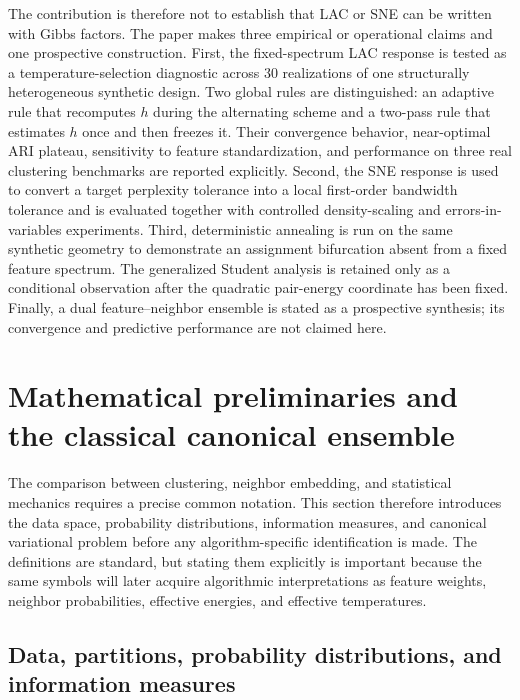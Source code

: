 \documentclass[11pt,a4paper]{article}
\theoremstyle{definition}
\theoremstyle{plain}
\begin{document}
The contribution is therefore not to establish that LAC or SNE can be written with Gibbs factors. The paper makes three empirical or operational claims and one prospective construction. First, the fixed-spectrum LAC response is tested as a temperature-selection diagnostic across 30 realizations of one structurally heterogeneous synthetic design. Two global rules are distinguished: an adaptive rule that recomputes $h$ during the alternating scheme and a two-pass rule that estimates $h$ once and then freezes it. Their convergence behavior, near-optimal ARI plateau, sensitivity to feature standardization, and performance on three real clustering benchmarks are reported explicitly. Second, the SNE response is used to convert a target perplexity tolerance into a local first-order bandwidth tolerance and is evaluated together with controlled density-scaling and errors-in-variables experiments. Third, deterministic annealing is run on the same synthetic geometry to demonstrate an assignment bifurcation absent from a fixed feature spectrum. The generalized Student analysis is retained only as a conditional observation after the quadratic pair-energy coordinate has been fixed. Finally, a dual feature--neighbor ensemble is stated as a prospective synthesis; its convergence and predictive performance are not claimed here.

\section{Mathematical preliminaries and the classical canonical ensemble}
\label{sec:classical}

The comparison between clustering, neighbor embedding, and statistical mechanics requires a precise common notation. This section therefore introduces the data space, probability distributions, information measures, and canonical variational problem before any algorithm-specific identification is made. The definitions are standard, but stating them explicitly is important because the same symbols will later acquire algorithmic interpretations as feature weights, neighbor probabilities, effective energies, and effective temperatures.

\subsection{Data, partitions, probability distributions, and information measures}
\label{subsec:notation}
\end{document}
